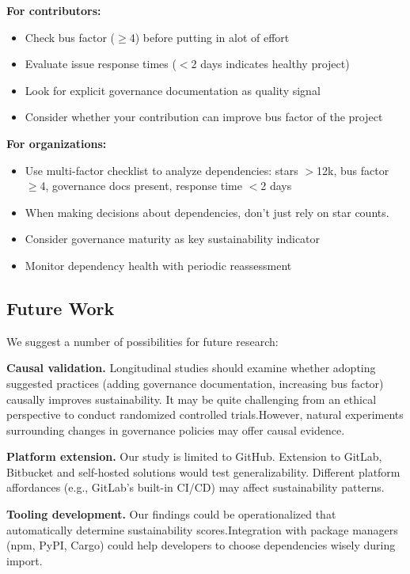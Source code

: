 \documentclass[conference]{IEEEtran}
\begin{document}
\textbf{For contributors:}
\begin{itemize}
    \item Check bus factor ($\geq$4) before putting in alot of effort
    \item Evaluate issue response times ($<$2 days indicates healthy project)
    \item Look for explicit governance documentation as quality signal
    \item Consider whether your contribution can improve bus factor of the project
\end{itemize}

\textbf{For organizations:}
\begin{itemize}
    \item Use multi-factor checklist to analyze dependencies: stars $>$12k, bus factor $\geq$4, governance docs present, response time $<$2 days
    \item When making decisions about dependencies, don't just rely on star counts.
    \item Consider governance maturity as key sustainability indicator
    \item Monitor dependency health with periodic reassessment
\end{itemize}

\subsection{Future Work}

We suggest a number of possibilities for future research:

\textbf{Causal validation.} Longitudinal studies should examine whether adopting suggested practices (adding governance documentation, increasing bus factor) causally improves sustainability. It may be quite challenging from an ethical perspective to conduct randomized controlled trials.However, natural experiments surrounding changes in governance policies may offer causal evidence.

\textbf{Platform extension.} Our study is limited to GitHub. Extension to GitLab, Bitbucket and self-hosted solutions would test generalizability. Different platform affordances (e.g., GitLab's built-in CI/CD) may affect sustainability patterns.

\textbf{Tooling development.} Our findings could be operationalized that automatically determine sustainability scores.Integration with package managers (npm, PyPI, Cargo) could help developers to choose dependencies wisely during import.
\end{document}
